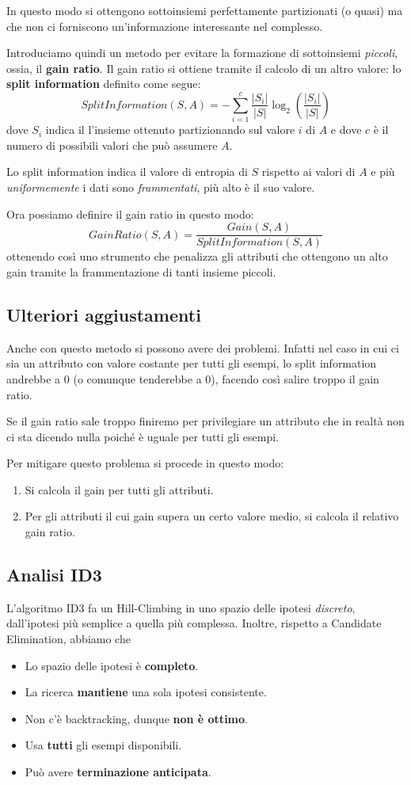 In questo modo si ottengono sottoinsiemi perfettamente partizionati (o quasi) ma che non ci forniscono
un'informazione interessante nel complesso.

Introduciamo quindi un metodo per evitare la formazione di sottoinsiemi \emph{piccoli}, ossia, il \textbf{gain ratio}. Il
gain ratio si ottiene tramite il calcolo di un altro valore: lo \textbf{split information} definito come segue:
\[ SplitInformation(S, A) = -\sum_{i=1}^c \frac{|S_i|}{|S|} \log_2 \left(\frac{|S_i|}{|S|}\right) \]
dove $S_i$ indica il l'insieme ottenuto partizionando sul valore $i$ di $A$ e dove $c$ \`e il numero di possibili valori
che pu\`o assumere $A$.

Lo split information indica il valore di entropia di $S$ rispetto ai valori di $A$ e pi\`u \emph{uniformemente} i dati
sono \emph{frammentati}, pi\`u alto \`e il suo valore.

Ora possiamo definire il gain ratio in questo modo:
\[ GainRatio(S, A) = \frac{Gain(S, A)}{SplitInformation(S, A)} \]
ottenendo cos\`i uno strumento che penalizza gli attributi che ottengono un alto gain tramite la frammentazione di tanti
insieme piccoli.

\subsection*{Ulteriori aggiustamenti}
Anche con questo metodo si possono avere dei problemi. Infatti nel caso in cui ci sia un attributo con valore costante
per tutti gli esempi, lo split information andrebbe a 0 (o comunque tenderebbe a 0), facendo cos\`i salire troppo il
gain ratio.

Se il gain ratio sale troppo finiremo per privilegiare un attributo che in realt\`a non ci sta dicendo nulla poich\'e
\`e uguale per tutti gli esempi.

Per mitigare questo problema si procede in questo modo:
\begin{enumerate}
	\item Si calcola il gain per tutti gli attributi.
	\item Per gli attributi il cui gain supera un certo valore medio, si calcola il relativo gain ratio.
\end{enumerate}

\subsection{Analisi ID3}
L'algoritmo ID3 fa un Hill-Climbing in uno spazio delle ipotesi \emph{discreto}, dall'ipotesi pi\`u semplice a quella
pi\`u complessa. Inoltre, rispetto a Candidate Elimination, abbiamo che
\begin{itemize}
	\item Lo spazio delle ipotesi \`e \textbf{completo}.
	\item La ricerca \textbf{mantiene} una sola ipotesi consistente.
	\item Non c'\`e backtracking, dunque \textbf{non \`e ottimo}.
	\item Usa \textbf{tutti} gli esempi disponibili.
	\item Pu\`o avere \textbf{terminazione anticipata}.
\end{itemize}

